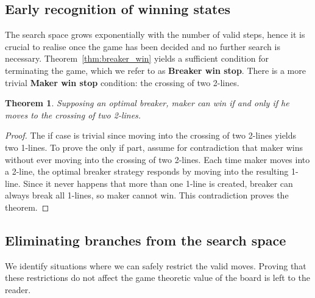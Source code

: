 \documentclass[conference]{IEEEtran}
\newtheorem{theorem}{Theorem}[section]
\theoremstyle{definition}
\begin{document}
\subsection{Early recognition of winning states}
The search space grows exponentially with the number of valid steps, hence it is crucial to realise once the game has been decided and no further search is necessary. Theorem~\ref{thm:breaker_win} yields a sufficient condition for terminating the game, which we refer to as {\bf Breaker win stop}.
There is a more trivial {\bf Maker win stop} condition: the crossing of two 2-lines.

\begin{theorem} 
\label{maker_win_condition}
Supposing an optimal breaker, maker can win if and only if he moves to the crossing of two 2-lines.
\end{theorem}

\begin{proof}
The if case is trivial since moving into the crossing of two 2-lines yields two 1-lines. To prove the only if part, assume for contradiction that maker wins without ever moving into the crossing of two 2-lines. Each time maker moves into a 2-line, the optimal breaker strategy responds by moving into the resulting 1-line. Since it never happens that more than one 1-line is created, breaker can always break all 1-lines, so maker cannot win. This contradiction proves the theorem.
\end{proof}

\subsection{Eliminating branches from the search space}
We identify situations where we can safely restrict the valid moves. Proving that these restrictions do not affect the game theoretic value of the board is 
left to the reader.
\end{document}
